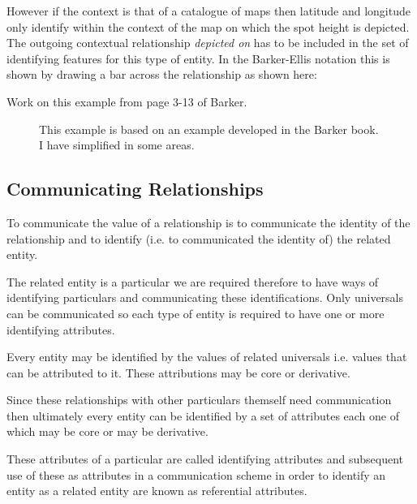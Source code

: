 \begin{center}

\end{center}

However if the context is that of a catalogue of maps then latitude and longitude only identify within the context of the map on which the spot height is depicted. The outgoing contextual relationship \textit{depicted on}
has to be included in the set of identifying features for this type of entity. In the Barker-Ellis notation this is shown by drawing a bar across the relationship as shown here:  

\begin{center}

\end{center}

\mynote Work on this example from page 3-13 of Barker.
\begin{figure}[H]
\begin{center}

\caption{This example is based on an example developed in the Barker book. I have simplified in some areas.}
\label{BoardingPass2}
\end{center}
\end{figure}

\subsection*{Communicating Relationships}
\mynote To communicate the value of a relationship is to communicate the identity of the relationship and  to identify (i.e. to communicated the identity of) the related entity. 

\mynote The related entity is a particular we are required therefore to have ways of identifying particulars and communicating these identifications.  
Only universals can be communicated so each type of entity is required 
to have one or more identifying attributes. 

\mynote Every entity may be identified by the values of related universals i.e. values that can be attributed to it. These attributions  may be core or derivative.


\mynote Since these relationships with other particulars themself need communication then ultimately every entity can be identified by a set of attributes each one of which may be core or may be derivative.  

\mynote
These attributes of a particular are called identifying attributes and subsequent use of these as attributes in a communication scheme in order to identify an entity as a related entity are known as referential attributes. 


